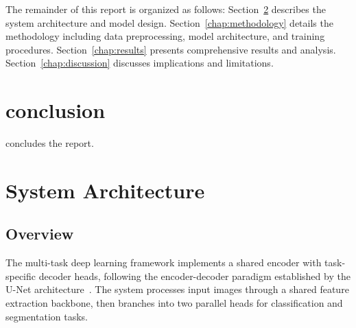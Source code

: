 \documentclass[11pt,a4paper,twoside]{report}
\newcommand{\secref}[1]{Section~\ref{#1}}
\begin{document}
The remainder of this report is organized as follows: \secref{chap:architecture} describes the system architecture and model design. \secref{chap:methodology} details the methodology including data preprocessing, model architecture, and training procedures. \secref{chap:results} presents comprehensive results and analysis. \secref{chap:discussion} discusses implications and limitations. \chapter{conclusion} concludes the report.

\chapter{System Architecture}\label{chap:architecture}

\section{Overview}

The multi-task deep learning framework implements a shared encoder with task-specific decoder heads, following the encoder-decoder paradigm established by the U-Net architecture~\cite{ronneberger2015unet}. The system processes input images through a shared feature extraction backbone, then branches into two parallel heads for classification and segmentation tasks.
\end{document}
